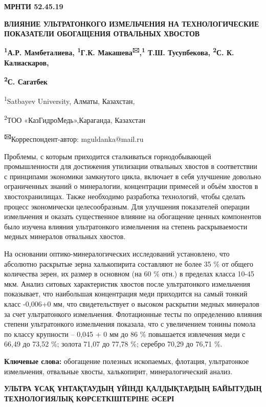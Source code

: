 
\newpage
{\bfseries МРНТИ 52.45.19}

{\bfseries ВЛИЯНИЕ УЛЬТРАТОНКОГО ИЗМЕЛЬЧЕНИЯ НА ТЕХНОЛОГИЧЕСКИЕ ПОКАЗАТЕЛИ
ОБОГАЩЕНИЯ ОТВАЛЬНЫХ ХВОСТОВ}

{\bfseries \textsuperscript{1}А.Р. Мамбеталиева, \textsuperscript{1}Г.К.
Макашева\textsuperscript{🖂},\textsuperscript{1} Т.Ш. Тусупбекова,
\textsuperscript{2}С. К. Калиаскаров,}

{\bfseries \textsuperscript{2}С. Сагатбек}

\textsuperscript{1}Satbayev University, Алматы, Казахстан,

\textsuperscript{2}ТОО «КазГидроМедь»,Караганда, Казахстан

{\bfseries \textsuperscript{🖂}}Корреспондент-автор: mguldanka@mail.ru

Проблемы, с которым приходится сталкиваться горнодобывающей
промышленности для достижения утилизации отвальных хвостов в
соответствии с принципами экономики замкнутого цикла, включает в себя
улучшение довольно ограниченных знаний о минералогии, концентрации
примесей и объём хвостов в хвостохранилищах. Также необходимо разработка
технологий, чтобы сделать процесс экономически целесообразным. Для
улучшения показателей операции измельчения и оказать существенное
влияние на обогащение ценных компонентов было изучена влияния
ультратонкого измельчения на степень раскрываемости медных минералов
отвальных хвостов.

На основании оптико-минералогических исследований установлено, что
абсолютно раскрытые зерна халькопирита составляют не более 35 \% от
общего количества зерен, их размер в основном (на 60 \% отн.) в пределах
класса 10-45 мкм. Анализ ситовых характеристик хвостов после
ультратонкого измельчения показывает, что наибольшая концентрация меди
приходится на самый тонкий класс -0,006+0 мм, что свидетельствует о
высоком раскрытии медных минералов за счет ультратонкого измельчения.
Флотационные тесты по определению влияния степени ультратонкого
измельчения показала, что с увеличением тонины помола по классу
крупности -- 0,045 + 0 мм до 86 \% повышается извлечения меди с 66,49 до
73,52 \%; золота 71,07 до 77,78 \%; серебро 70,29 до 76,71 \%.

{\bfseries Ключевые слова:} обогащение полезных ископаемых, флотация,
ультратонкое измельчения, отвальные хвосты, халькопирит,
минералогический анализ.

{\bfseries УЛЬТРА ҰСАҚ ҰНТАҚТАУДЫҢ ҮЙІНДІ ҚАЛДЫҚТАРДЫҢ БАЙЫТУДЫҢ
ТЕХНОЛОГИЯЛЫҚ КӨРСЕТКІШТЕРІНЕ ӘСЕРІ}

